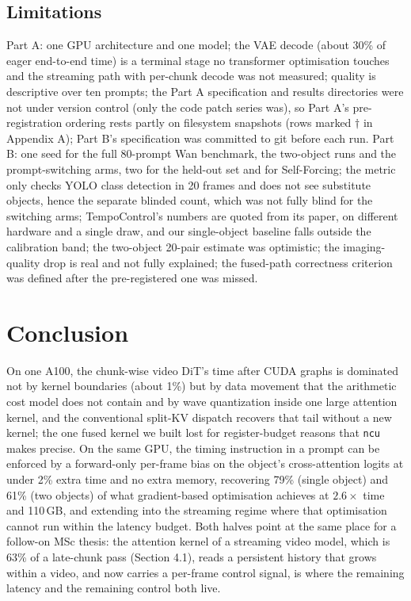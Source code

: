 \documentclass[10pt,a4paper]{article}
\begin{document}
\subsection{Limitations}
Part A: one GPU architecture and one model; the VAE decode (about 30\% of eager end-to-end time) is a terminal stage no transformer optimisation touches and the streaming path with per-chunk decode was not measured; quality is descriptive over ten prompts; the Part A specification and results directories were not under version control (only the code patch series was), so Part A's pre-registration ordering rests partly on filesystem snapshots (rows marked $\dagger$ in Appendix A); Part B's specification was committed to git before each run. Part B: one seed for the full 80-prompt Wan benchmark, the two-object runs and the prompt-switching arms, two for the held-out set and for Self-Forcing; the metric only checks YOLO class detection in 20 frames and does not see substitute objects, hence the separate blinded count, which was not fully blind for the switching arms; TempoControl's numbers are quoted from its paper, on different hardware and a single draw, and our single-object baseline falls outside the calibration band; the two-object 20-pair estimate was optimistic; the imaging-quality drop is real and not fully explained; the fused-path correctness criterion was defined after the pre-registered one was missed.

\section{Conclusion}
On one A100, the chunk-wise video DiT's time after CUDA graphs is dominated not by kernel boundaries (about 1\%) but by data movement that the arithmetic cost model does not contain and by wave quantization inside one large attention kernel, and the conventional split-KV dispatch recovers that tail without a new kernel; the one fused kernel we built lost for register-budget reasons that \texttt{ncu} makes precise. On the same GPU, the timing instruction in a prompt can be enforced by a forward-only per-frame bias on the object's cross-attention logits at under 2\% extra time and no extra memory, recovering 79\% (single object) and 61\% (two objects) of what gradient-based optimisation achieves at $2.6\times$ time and 110\,GB, and extending into the streaming regime where that optimisation cannot run within the latency budget. Both halves point at the same place for a follow-on MSc thesis: the attention kernel of a streaming video model, which is 63\% of a late-chunk pass (Section 4.1), reads a persistent history that grows within a video, and now carries a per-frame control signal, is where the remaining latency and the remaining control both live.
\end{document}
